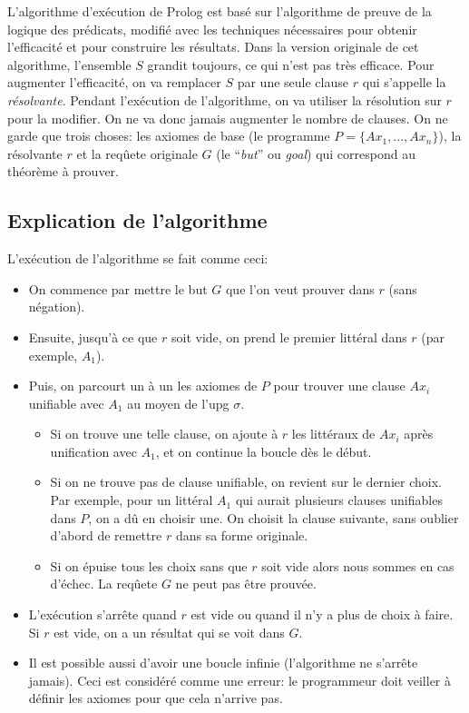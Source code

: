 L'algorithme d'exécution de Prolog est basé sur l'algorithme de preuve de la logique des prédicats,
modifié avec les techniques nécessaires pour obtenir l'efficacité et pour construire les résultats.
Dans la version originale de cet algorithme, l'ensemble $S$ grandit toujours, ce qui n'est pas très efficace.
Pour augmenter l'efficacité, on va remplacer $S$ par une seule clause $r$ qui s'appelle la {\em résolvante}.
Pendant l'exécution de l'algorithme, on va utiliser la résolution sur $r$ pour la modifier.
On ne va donc jamais augmenter le nombre de clauses.
On ne garde que trois choses:
les axiomes de base (le programme $P=\{Ax_1, ..., Ax_n\}$),
la résolvante $r$
et la reqûete originale $G$ (le ``{\em but}'' ou {\em goal})
qui correspond au théorème à prouver.

\subsection{Explication de l'algorithme}

L'exécution de l'algorithme se fait comme ceci:
\begin{itemize}
\item On commence par mettre le but $G$ que l’on veut prouver dans $r$ (sans négation).
\item Ensuite, jusqu’à ce que $r$ soit vide, on prend le premier littéral dans $r$ (par exemple, $A_1$).
\item Puis, on parcourt un à un les axiomes de $P$
pour trouver une clause $Ax_{i}$ unifiable avec $A_{1}$ au moyen de l'upg $\sigma$.

\begin{itemize}
\item Si on trouve une telle clause, on ajoute à $r$ les littéraux de $Ax_{i}$ après unification
avec $A_{1}$, et on continue la boucle dès le début.
\item Si on ne trouve pas de clause unifiable, on revient sur le dernier choix.
Par exemple, pour un littéral $A_{1}$ qui aurait plusieurs clauses unifiables dans $P$, on a dû en choisir une.
On choisit la clause suivante, sans oublier d'abord de remettre $r$ dans sa forme originale.
\item Si on épuise tous les choix sans que $r$ soit vide alors nous sommes en cas d’échec.
La reqûete $G$ ne peut pas être prouvée.
\end{itemize}

\item L'exécution s'arrête quand $r$ est vide ou quand il n'y a plus de choix à faire.
Si $r$ est vide, on a un résultat qui se voit dans $G$.
\item Il est possible aussi d'avoir une boucle infinie (l'algorithme ne s'arrête jamais).
Ceci est considéré comme une erreur: le programmeur doit veiller à définir les axiomes
pour que cela n'arrive pas.
\end{itemize}

